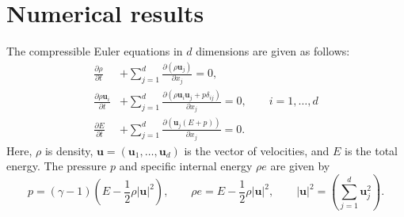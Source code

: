 \documentclass[review,onefignum,onetabnum,final]{siamart171218}
\newcommand{\pd}[2]{\frac{\partial#1}{\partial#2}}
\newcommand{\LRp}[1]{\left( #1 \right)}
\newcommand{\LRb}[1]{\left| #1 \right|}
\begin{document}
\section{Numerical results}
\label{sec:3}
The compressible Euler equations in $d$ dimensions are given as follows:
\begin{align*}
\pd{\rho}{t} &+ \sum_{j=1}^d \pd{\LRp{\rho \bm{u}_j}}{x_j} = 0,\\
\pd{\rho \bm{u}_i}{t} &+ \sum_{j=1}^d \pd{\LRp{\rho \bm{u}_i\bm{u}_j + p\delta_{ij} }}{x_j} = 0, \qquad i = 1,\ldots,d\\
\pd{E}{t} &+ \sum_{j=1}^d \pd{\LRp{\bm{u}_j(E+p)}}{x_j} = 0.\nonumber
\end{align*}
Here, $\rho$ is density, $\bm{u} = \LRp{\bm{u}_1, \ldots,\bm{u}_d}$ is the vector of velocities, and $E$ is the total energy.  The pressure $p$ and specific internal energy $\rho e$ are given by 
\[
p = (\gamma-1)\LRp{E - \frac{1}{2}\rho \LRb{\bm{u}}^2}, \qquad \rho e = E - \frac{1}{2}\rho \LRb{\bm{u}}^2, \qquad \LRb{\bm{u}}^2 = \LRp{\sum_{j=1}^d \bm{u}_j^2}.
\]
\end{document}
